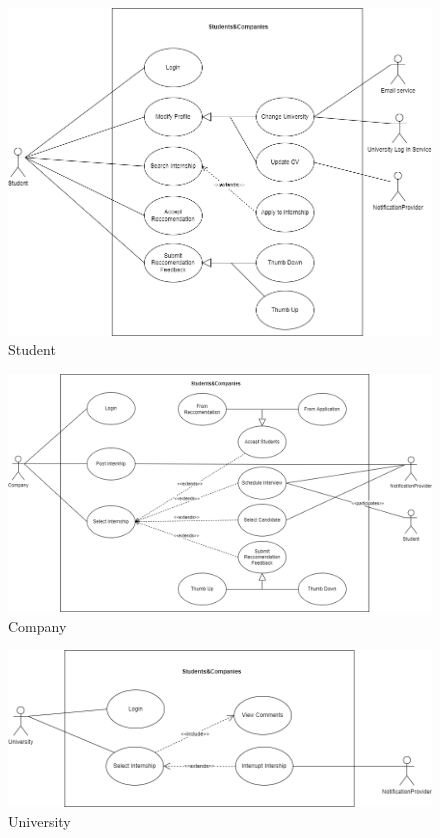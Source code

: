 \documentclass[a4paper,12pt]{article}
\begin{document}
\begin{figure}[H]
    \centering
    \includegraphics[scale = 0.45]{figures/UseCasesDiagrams/StudentUC.drawio.png}
    \caption{Student}
    \centering
\end{figure}
\begin{figure}[H]
    \centering
    \includegraphics[scale = 0.4]{figures/UseCasesDiagrams/CompanyUC.drawio.png}
    \caption{Company}
    \centering
\end{figure}
\begin{figure}[H]
    \centering
    \includegraphics[scale = 0.45]{figures/UseCasesDiagrams/use_case_1-University.drawio.png}
    \caption{University}
    \centering
\end{figure}
\end{document}
